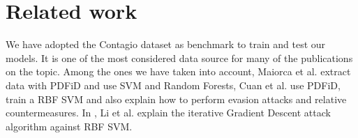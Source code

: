 \documentclass[twocolumn, switch]{article} %
\begin{document}
\section{Related work}
\label{sec:relatedwork}
We have adopted the Contagio dataset \cite{Contagio} as benchmark to train and test our models. It is one of the most considered data source for many of the publications on the topic. Among the ones we have taken into account, Maiorca et al. \cite{maiorca_giacinto_corona_1970} extract data with PDFiD \cite{PDFiD} and use SVM and Random Forests,  Cuan et al. \cite{cuan_damien_delaplace_valois_2018} use PDFiD, train a RBF SVM and also explain how to perform evasion attacks and relative countermeasures. In \cite{li_liu_yan_yang_2022}, Li et al. explain the iterative Gradient Descent attack algorithm against RBF SVM.

\end{document}
